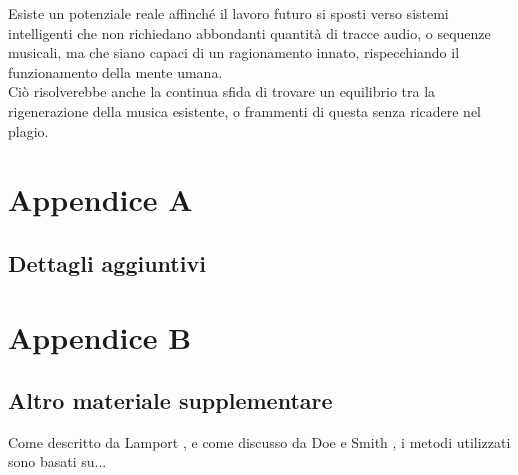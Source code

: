 \documentclass[a4paper,12pt]{report}
\begin{document}
Esiste un potenziale reale affinché il lavoro futuro si sposti verso sistemi intelligenti che non richiedano abbondanti quantità di tracce audio, o sequenze musicali, 
ma che siano capaci di un ragionamento innato, rispecchiando il funzionamento della mente umana. \\
Ciò risolverebbe anche la continua sfida di trovare un equilibrio tra la rigenerazione della musica esistente, o frammenti di questa senza ricadere nel plagio.

\appendix
\chapter{Appendice A}
\section{Dettagli aggiuntivi}

\chapter{Appendice B}
\section{Altro materiale supplementare}

Come descritto da Lamport \cite{latex}, e come discusso da Doe e Smith \cite{example_article}, i metodi utilizzati sono basati su...



\end{document}
